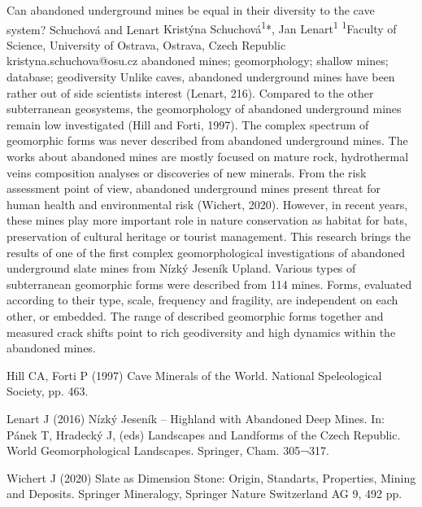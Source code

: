 \abstract
{Can abandoned underground mines be equal in their diversity to the cave system?} 
{Schuchová and Lenart} 
{Kristýna Schuchová\textsuperscript{1}*, Jan Lenart\textsuperscript{1}} 
{\TLtag} 
{
	\textsuperscript{1}Faculty of Science, University of Ostrava, Ostrava, Czech Republic
}
{kristyna.schuchova@osu.cz}  %
{abandoned mines; geomorphology; shallow mines; database; geodiversity}
{Unlike caves, abandoned underground mines have been rather out of side scientists interest (Lenart, 216). Compared to the other subterranean geosystems, the geomorphology of abandoned underground mines remain low investigated (Hill and Forti, 1997). The complex spectrum of geomorphic forms was never described from abandoned underground mines. The works about abandoned mines are mostly focused on mature rock, hydrothermal veins composition analyses or discoveries of new minerals. From the risk assessment point of view, abandoned underground mines present threat for human health and environmental risk (Wichert, 2020). However, in recent years, these mines play more important role in nature conservation as habitat for bats, preservation of cultural heritage or tourist management. This research brings the results of one of the first complex geomorphological investigations of abandoned underground slate mines from Nízký Jeseník Upland. Various types of subterranean geomorphic forms were described from 114 mines. Forms, evaluated according to their type, scale, frequency and fragility, are independent on each other, or embedded. The range of described geomorphic forms together and measured crack shifts point to rich geodiversity and high dynamics within the abandoned mines.
}
{Hill CA, Forti P (1997) Cave Minerals of the World. National Speleological Society, pp. 463. 

Lenart J (2016) Nízký Jeseník – Highland with Abandoned Deep Mines. In: Pánek T, Hradecký J, (eds) Landscapes and Landforms of the Czech Republic. World Geomorphological Landscapes. Springer, Cham. 305¬317. 

Wichert J (2020) Slate as Dimension Stone: Origin, Standarts, Properties, Mining and Deposits. Springer Mineralogy, Springer Nature Switzerland AG 9, 492 pp. 
}
